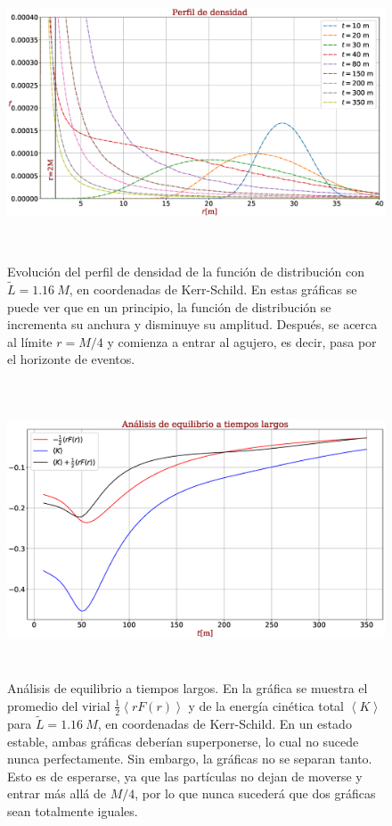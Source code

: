 \documentclass[11pt,twoside,openright,spanish]{report}
\numberwithin{equation}{chapter}
\numberwithin{figure}{chapter}
\numberwithin{table}{chapter}
\begin{document}
\begin{figure}[H]
	\centering
	\includegraphics[height=8.75cm]{graphs_study/LmenorKSGraphs/densityProfileLmenorKS}
	\caption{Evolución del perfil de densidad de la función de distribución con $\tilde{L}=1.16\ M$, en coordenadas de Kerr-Schild. En estas gráficas se puede ver que en un principio, la función de distribución se incrementa su anchura y disminuye su amplitud. Después, se acerca al límite $r=M/4$ y comienza a entrar al agujero, es decir, pasa por el horizonte de eventos.}
	\label{densityProfileKSLmenor}
\end{figure}

\begin{figure}[H]
	\centering
	\includegraphics[height=8.75cm]{graphs_study/LmenorKSGraphs/stabilityKSMenor.eps}
	\caption{Análisis de equilibrio a tiempos largos. En la gráfica se muestra el promedio del virial $\frac{1}{2}\left<rF(r)\right>$ y de la energía cinética total $\left<K\right>$ para $\tilde{L}=1.16\ M$, en coordenadas de Kerr-Schild. En un estado estable, ambas gráficas deberían superponerse, lo cual no sucede nunca perfectamente. Sin embargo, la gráficas no se separan tanto. Esto es de esperarse, ya que las partículas no dejan de moverse y entrar más allá de $M/4$, por lo que nunca sucederá que dos gráficas sean totalmente iguales.}
	\label{stabilityKSLmenor}
\end{figure}
\end{document}
